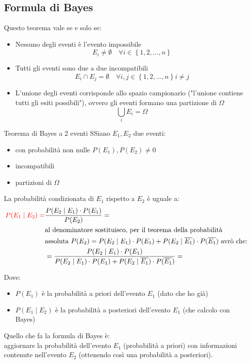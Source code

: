 \documentclass{article}  %
\theoremstyle{definition}
\begin{document}
\subsection{Formula di Bayes}
Questo teorema vale se e solo se:
\begin{itemize}
	\item Nessuno degli eventi è l'evento impossibile \\
	      \[
		      E_i \neq \emptyset \quad \forall{i} \in \left\{1,2,...,n\right\}
	      \]
	\item Tutti gli eventi sono due a due incompatibili \\
	      \[
		      E_i \cap E_j=\emptyset \quad \forall{i,j} \in \left\{1,2,...,n\right\} i \neq j
	      \]
	\item L'unione degli eventi corrisponde allo spazio campionario ("l'unione contiene tutti gli esiti possibili"), ovvero
	      gli eventi formano una partizione di $\Omega$ \\
	      \[
		      \bigcup_{i} E_i = \Omega
	      \]
\end{itemize}
\begin{theorem}{Teorema di Bayes a 2 eventi}
	SSiano $E_1, E_2$ due eventi:
	\begin{itemize}
		\item con probabilità non nulle $P(E_1),P(E_2) \neq 0$
		\item incompatibili
		\item partizioni di $\Omega$
	\end{itemize}
	La probabilità condizionata di $E_1$ rispetto a $E_2$ è uguale a:
	\begin{align*}
		\textcolor{red}{P(E_1 \mid E_2)=}
		 & \frac{P(E_2 \mid E_1) \cdot P(E_1)}{P(E_2)}=                                                                                \\
		 & \text{al denominatore sostituisco, per il teorema della probabilità}                                                        \\
		 & \text{assoluta } P(E_2) = P(E_2 \mid E_1) \cdot P(E_1)+P(E_2 \mid \overline{E_1}) \cdot P(\overline{E_1}) \text{ avrò che:} \\
		 & = \frac{P(E_2 \mid E_1) \cdot P(E_1)}{P(E_2 \mid E_1) \cdot P(E_1)+P(E_2 \mid \overline{E_1}) \cdot P(\overline{E_1})} =
	\end{align*}

	Dove:
	\begin{itemize}
		\item $P(E_1)$ è la probabilità a priori dell'evento $E_1$ (dato che ho già)
		\item $P(E_1 \mid E_2)$ è la probabilità a posteriori dell'evento $E_1$ (che calcolo con Bayes)
	\end{itemize}
	Quello che fa la formula di Bayes è: \\
	aggiornare la probabilità dell'evento $E_1$ (probabilità a priori) con informazioni contenute nell'evento $E_2$
	(ottenendo così una probabilità a posteriori).
\end{theorem}
\end{document}
